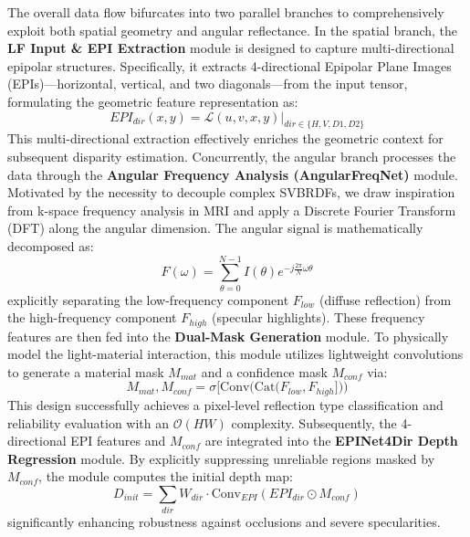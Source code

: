 The overall data flow bifurcates into two parallel branches to comprehensively exploit both spatial geometry and angular reflectance. In the spatial branch, the \textbf{LF Input & EPI Extraction} module is designed to capture multi-directional epipolar structures. Specifically, it extracts 4-directional Epipolar Plane Images (EPIs)—horizontal, vertical, and two diagonals—from the input tensor, formulating the geometric feature representation as:
\begin{equation}
\label{eq:eq27}
EPI_{dir}(x, y) = \mathcal{L}(u, v, x, y) \Big|_{dir \in \{H, V, D1, D2\}}
\end{equation}
This multi-directional extraction effectively enriches the geometric context for subsequent disparity estimation. Concurrently, the angular branch processes the data through the \textbf{Angular Frequency Analysis (AngularFreqNet)} module. Motivated by the necessity to decouple complex SVBRDFs, we draw inspiration from k-space frequency analysis in MRI and apply a Discrete Fourier Transform (DFT) along the angular dimension. The angular signal is mathematically decomposed as:
\begin{equation}
\label{eq:eq28}
F(\omega) = \sum_{\theta=0}^{N-1} I(\theta) e^{-j \frac{2\pi}{N} \omega \theta}
\end{equation}
explicitly separating the low-frequency component $F_{low}$ (diffuse reflection) from the high-frequency component $F_{high}$ (specular highlights). These frequency features are then fed into the \textbf{Dual-Mask Generation} module. To physically model the light-material interaction, this module utilizes lightweight convolutions to generate a material mask $M_{mat}$ and a confidence mask $M_{conf}$ via:
\begin{equation}
\label{eq:eq29}
M_{mat}, M_{conf} = \sigma\Big [\text{Conv}\big(\text{Cat}(F_{low}, F_{high}]\big)\Big)
\end{equation}
This design successfully achieves a pixel-level reflection type classification and reliability evaluation with an $\mathcal{O}(HW)$ complexity. Subsequently, the 4-directional EPI features and $M_{conf}$ are integrated into the \textbf{EPINet4Dir Depth Regression} module. By explicitly suppressing unreliable regions masked by $M_{conf}$, the module computes the initial depth map:
\begin{equation}
\label{eq:eq30}
D_{init} = \sum_{dir} W_{dir} \cdot \text{Conv}_{EPI}(EPI_{dir} \odot M_{conf})
\end{equation}
significantly enhancing robustness against occlusions and severe specularities.

